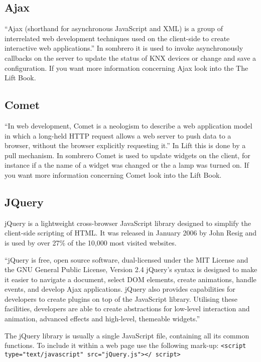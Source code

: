\subsection{Ajax}
    ``Ajax (shorthand for asynchronous JavaScript and XML) is a group of interrelated web development techniques used on the client-side to create interactive web applications.''\cite{wikipedia.org:ajax} In sombrero it is used to invoke asynchronously callbacks on the server to update the status of KNX devices or change and save a configuration. If you want more information concerning Ajax look into the The Lift Book\cite{becker:09}.

\subsection{Comet}
``In web development, Comet is a neologism to describe a web application model in which a long-held HTTP request allows a web server to push data to a browser, without the browser explicitly requesting it.''\cite{wikipedia.org:comet} In Lift this is done by a pull mechanism. In sombrero Comet is used to update widgets on the client, for instance if a the name of a widget was changed or the a lamp was turned on. If you want more information concerning Comet look into the Lift Book\cite{becker:09}.

\subsection{JQuery}
    jQuery is a lightweight cross-browser JavaScript library designed to simplify the client-side scripting of HTML. It was released in January 2006 by John Resig and is used by over 27\% of the 10,000 most visited websites.

    ``jQuery is free, open source software, dual-licensed under the MIT License and the GNU General Public License, Version 2.4 jQuery's syntax is designed to make it easier to navigate a document, select DOM elements, create animations, handle events, and develop Ajax applications. jQuery also provides capabilities for developers to create plugins on top of the JavaScript library. Utilising these facilities, developers are able to create abstractions for low-level interaction and animation, advanced effects and high-level, themeable widgets.''\cite{wikipedia.org:jquery}

    The jQuery library is usually a single JavaScript file, containing all its common functions. To include it within a web page use the following mark-up:
    \lstinline!<script type="text/javascript" src="jQuery.js"></ script>!

